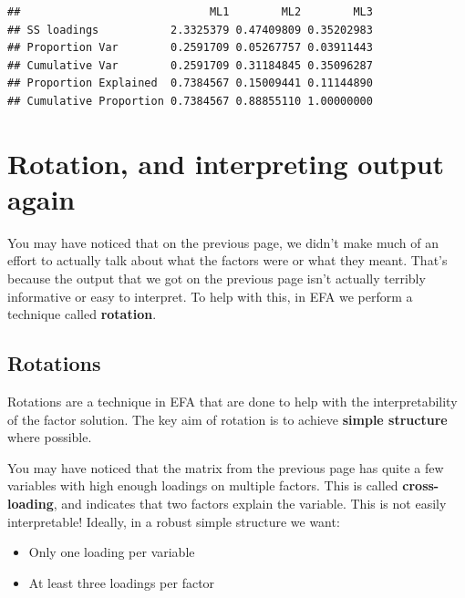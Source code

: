 \documentclass[
]{book}
\newenvironment{Shaded}{\begin{snugshade}}{\end{snugshade}}
\newcommand{\NormalTok}[1]{#1}
\newcommand{\SpecialCharTok}[1]{\textcolor[rgb]{0.81,0.36,0.00}{\textbf{#1}}}
\providecommand{\tightlist}{%
  \setlength{\itemsep}{0pt}\setlength{\parskip}{0pt}}
\begin{document}
\begin{Shaded}
\end{Shaded}

\begin{verbatim}
##                             ML1        ML2        ML3
## SS loadings           2.3325379 0.47409809 0.35202983
## Proportion Var        0.2591709 0.05267757 0.03911443
## Cumulative Var        0.2591709 0.31184845 0.35096287
## Proportion Explained  0.7384567 0.15009441 0.11144890
## Cumulative Proportion 0.7384567 0.88855110 1.00000000
\end{verbatim}

\section{Rotation, and interpreting output again}\label{rotation-and-interpreting-output-again}

You may have noticed that on the previous page, we didn't make much of an effort to actually talk about what the factors were or what they meant. That's because the output that we got on the previous page isn't actually terribly informative or easy to interpret. To help with this, in EFA we perform a technique called \textbf{rotation}.

\subsection{Rotations}\label{rotations}

Rotations are a technique in EFA that are done to help with the interpretability of the factor solution. The key aim of rotation is to achieve \textbf{simple structure} where possible.

You may have noticed that the matrix from the previous page has quite a few variables with high enough loadings on multiple factors. This is called \textbf{cross-loading}, and indicates that two factors explain the variable. This is not easily interpretable! Ideally, in a robust simple structure we want:

\begin{itemize}
\tightlist
\item
  Only one loading per variable
\item
  At least three loadings per factor
\end{itemize}
\end{document}
